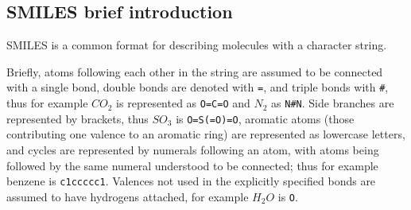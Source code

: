 \subsection{SMILES brief introduction}
SMILES \cite{Weininger88} is a common format for describing molecules with a character string.
 
Briefly, atoms following each other in the string are assumed to be connected with a single bond, double bonds are denoted with \verb|=|, and triple bonds with \verb|#|, thus for example $CO_2$ is represented as \verb|O=C=O| and $N_2$ as \verb|N#N|. Side branches are represented by brackets, thus $SO_3$ is \verb|O=S(=O)=O|, aromatic atoms (those contributing one valence to an aromatic ring) are represented as lowercase letters, and cycles are represented by numerals following an atom, with atoms being followed by the same numeral understood to be connected; thus for example benzene is \verb|c1ccccc1|. Valences not used in the explicitly specified bonds are assumed to have hydrogens attached, for example $H_2O$ is \verb|O|.